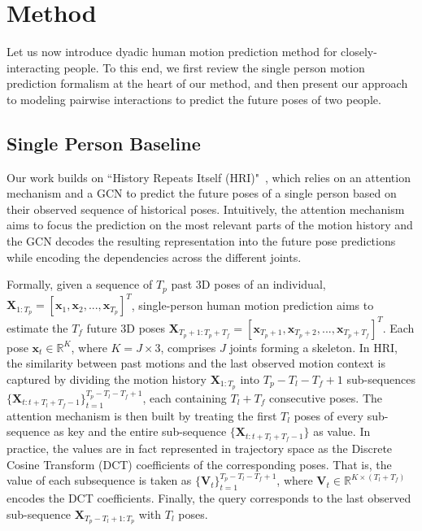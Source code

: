 \section{Method}

Let us now introduce dyadic human motion prediction method for closely-interacting people. To this end, we first review the single person motion prediction formalism at the heart of our method, and then present our approach to modeling pairwise interactions to predict the future poses of two people. 

\subsection{Single Person Baseline}

Our work builds on ``History Repeats Itself (HRI)"~\cite{Mao20}, which relies on an attention mechanism and a GCN to predict the future poses of a single person based on their observed sequence of historical poses. Intuitively, the attention mechanism aims to focus the prediction on the most relevant parts of the motion history and the GCN decodes the resulting representation into the future pose predictions while encoding the dependencies across the different joints. 

Formally, given a sequence of ${T}_p$ past 3D poses of an individual, $\textbf{X}_{1:{T}_p}=[\textbf{x}_{1}, \textbf{x}_{2}, ...,\textbf{x}_{{T}_p}]^T$, single-person human motion prediction aims to estimate the ${T}_f$ future 3D poses $\textbf{X}_{{T}_p+1:{T}_p+{T}_f}=[\textbf{x}_{{T}_p+1}, \textbf{x}_{{T}_p+2}, ...,\textbf{x}_{{T}_p+{T}_f}]^T$. Each pose $\textbf{x}_t \in \mathbb{R}^K$, where $K= J\times 3$, comprises $J$ joints forming a skeleton.
In HRI, the similarity between past motions and the last observed motion context is captured by dividing the motion history $\textbf{X}_{1:{T}_p}$ into ${T}_p-{T}_l-{T}_f+1$ sub-sequences $\{\textbf{X}_{t:t+{T}_l+{T}_f-1}\}_{t=1}^{{T}_p-{T}_l-{T}_f+1}$, each containing ${T}_l+{T}_f$ consecutive poses. The attention mechanism is then built by treating the first $T_l$ poses of every sub-sequence as key and the entire sub-sequence $\{\textbf{X}_{t:t+{T}_l+{T}_f-1}\}$ as value. In practice, the values are in fact represented in trajectory space as the Discrete Cosine Transform (DCT) coefficients of the corresponding poses. That is, the value of each subsequence is taken as $\{\textbf{V}_{t}\}_{t=1}^{{T}_p-{T}_l-{T}_f+1}$, where $\textbf{V}_{t} \in \mathbb{R}^{K \times ({T}_l+{T}_f)}$ encodes the DCT coefficients. Finally, the query corresponds to the last observed sub-sequence $\textbf{X}_{{T}_p-{T}_l+1:{T}_p}$ with $T_l$ poses. 

